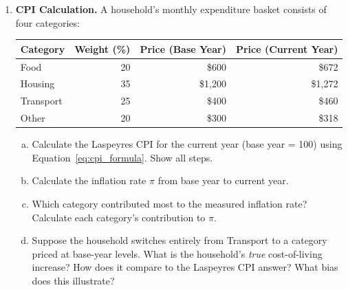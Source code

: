 \begin{enumerate}

\item \textbf{CPI Calculation.} A household's monthly expenditure basket
consists of four categories:

\begin{center}
\begin{tabular}{lrrr}
\toprule
Category & Weight (\%) & Price (Base Year) & Price (Current Year) \\
\midrule
Food     & 20 & \$600 & \$672 \\
Housing  & 35 & \$1{,}200 & \$1{,}272 \\
Transport& 25 & \$400 & \$460 \\
Other    & 20 & \$300 & \$318 \\
\bottomrule
\end{tabular}
\end{center}

\begin{enumerate}[(a)]
  \item Calculate the Laspeyres CPI for the current year
        (base year = 100) using Equation~\ref{eq:cpi_formula}.
        Show all steps.
  \item Calculate the inflation rate $\pi$ from base year to current year.
  \item Which category contributed most to the measured inflation rate?
        Calculate each category's contribution to $\pi$.
  \item Suppose the household switches entirely from Transport to a
        category priced at base-year levels. What is the household's
        \textit{true} cost-of-living increase? How does it compare
        to the Laspeyres CPI answer? What bias does this illustrate?
\end{enumerate}


\end{enumerate}
